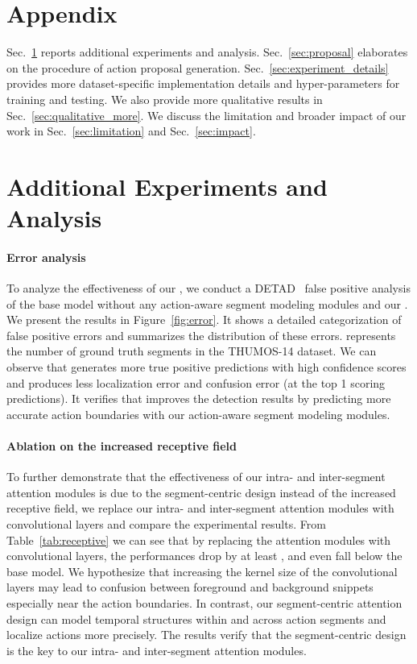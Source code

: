 \appendix
\section*{Appendix}

Sec.~\ref{sec:extra} reports additional experiments and analysis.
Sec.~\ref{sec:proposal} elaborates on the procedure of action proposal generation.
Sec.~\ref{sec:experiment_details} provides more dataset-specific implementation details and hyper-parameters for training and testing.
We also provide more qualitative results in Sec.~\ref{sec:qualitative_more}.
We discuss the limitation and broader impact of our work in Sec.~\ref{sec:limitation} and Sec.~\ref{sec:impact}.


\section{Additional Experiments and Analysis}
\label{sec:extra}

\paragraph{Error analysis}
To analyze the effectiveness of our \system, we conduct a DETAD~\cite{alwassel_2018_detad} false positive analysis of the base model without any action-aware segment modeling modules and our \system. We present the results in Figure~\ref{fig:error}. It shows a detailed categorization of false positive errors and summarizes the distribution of these errors.
 represents the number of ground truth segments in the THUMOS-14 dataset. 
We can observe that \system generates more true positive predictions with high confidence scores and produces less localization error and confusion error (at the top 1 scoring predictions).
It verifies that \system improves the detection results by predicting more accurate action boundaries with our action-aware segment modeling modules.

\paragraph{Ablation on the increased receptive field}
To further demonstrate that the effectiveness of our intra- and inter-segment attention modules is due to the segment-centric design instead of the increased receptive field, we replace our intra- and inter-segment attention modules with convolutional layers and compare the experimental results. From Table~\ref{tab:receptive} we can see that by replacing the attention modules with convolutional layers, the performances drop by 
at least , and even fall below the base model. We hypothesize that increasing the kernel size of the convolutional layers may lead to confusion between foreground and background snippets especially near the action boundaries.
In contrast, our segment-centric attention design can model temporal structures within and across action segments and localize actions more precisely.
The results verify that the segment-centric design is the key to our intra- and inter-segment attention modules.


